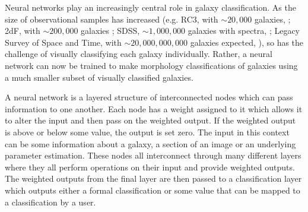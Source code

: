 Neural networks play an increasingly central role in galaxy classification. As the size of observational samples has increased (e.g. RC3, with $\sim 20,000$ galaxies, \citealt{1991rc3..book.....D}; 2dF, with $\sim 200,000$ galaxies \citealt{2001MNRAS.328.1039C}; SDSS, $\sim 1,000,000$ galaxies with spectra, \citealt{2000AJ....120.1579Y, 2009ApJS..182..543A}; Legacy Survey of Space and Time, with $\sim 20,000,000,000$ galaxies expected, \citealt{2019ApJ...873..111I}), so has the challenge of visually classifying each galaxy individually. Rather, a neural network can now be trained to make morphology classifications of galaxies using a much smaller subset of visually classified galaxies.
\DIFaddbegin 

\DIFaddend A neural network is a layered structure of interconnected nodes which can pass information to one another. Each node has a weight assigned to it which allows it to alter the input and then pass on the weighted output. If the weighted output is above or below some value, the output is set zero. The input in this context can be some information about a galaxy, a section of an image or an underlying parameter estimation. These nodes all interconnect through many different layers where they all perform operations on their input and provide weighted outputs. The weighted outputs from the final layer are then passed to a classification layer which outputs either a formal classification or some value that can be mapped to a classification by a user.


